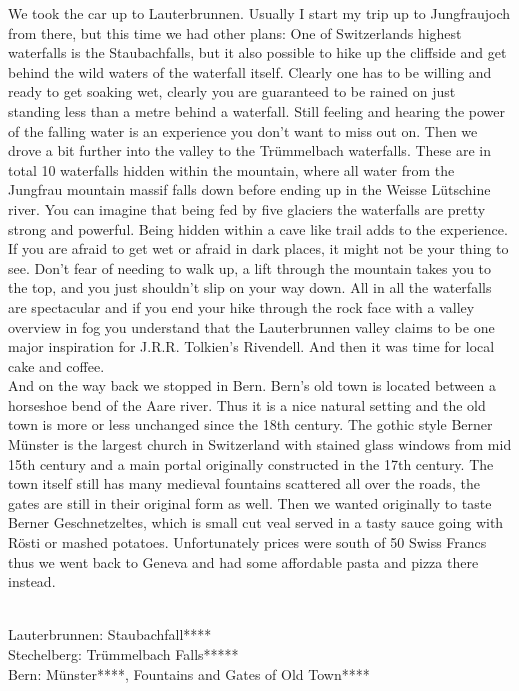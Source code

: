 We took the car up to Lauterbrunnen. Usually I start my trip up to Jungfraujoch from there, but this time we had other plans: One of Switzerlands highest waterfalls is the Staubachfalls, but it also possible to hike up the cliffside and get behind the wild waters of the waterfall itself. Clearly one has to be willing and ready to get soaking wet, clearly you are guaranteed to be rained on just standing less than a metre behind a waterfall. Still feeling and hearing the power of the falling water is an experience you don't want to miss out on. Then we drove a bit further into the valley to the Tr\"ummelbach waterfalls. These are in total 10 waterfalls hidden within the mountain, where all water from the Jungfrau mountain massif falls down before ending up in the Weisse L\"utschine river. You can imagine that being fed by five glaciers the waterfalls are pretty strong and powerful. Being hidden within a cave like trail adds to the experience. If you are afraid to get wet or afraid in dark places, it might not be your thing to see. Don't fear of needing to walk up, a lift through the mountain takes you to the top, and you just shouldn't slip on your way down. All in all the waterfalls are spectacular and if you end your hike through the rock face with a valley overview in fog you understand that the Lauterbrunnen valley claims to be one major inspiration for J.R.R. Tolkien's Rivendell. And then it was time for local cake and coffee.\\
And on the way back we stopped in Bern. Bern's old town is located between a horseshoe bend of the Aare river. Thus it is a nice natural setting and the old town is more or less unchanged since the 18th century. The gothic style Berner M\"unster is the largest church in Switzerland with stained glass windows from mid 15th century and a main portal originally constructed in the 17th century. The town itself still has many medieval fountains scattered all over the roads, the gates are still in their original form as well. Then we wanted originally to taste Berner Geschnetzeltes, which is small cut veal served in a tasty sauce going with R\"osti or mashed potatoes. Unfortunately prices were south of 50 Swiss Francs thus we went back to Geneva and had some affordable pasta and pizza there instead.\\\

Lauterbrunnen: Staubachfall****\\
Stechelberg: Tr\"ummelbach Falls*****\\
Bern: M\"unster****, Fountains and Gates of Old Town****\\

